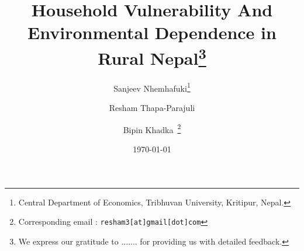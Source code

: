 \begin{titlepage}
\title{\vspace{-2.0cm}Household Vulnerability And Environmental Dependence in Rural Nepal\footnote{We express our gratitude to ....... for providing us with detailed feedback.}
}
\author{Sanjeev Nhemhafuki\thanks{Central Department of Economics, Tribhuvan University, Kritipur, Nepal.} \and   Resham  Thapa-Parajuli\footnotemark[2]
\and Bipin Khadka\footnotemark[2]  ~\thanks{Corresponding email : \texttt{resham3[at]gmail[dot]com}}}
\date{\today}
\maketitle

\thispagestyle{empty}
\end{titlepage}
\pagebreak 
